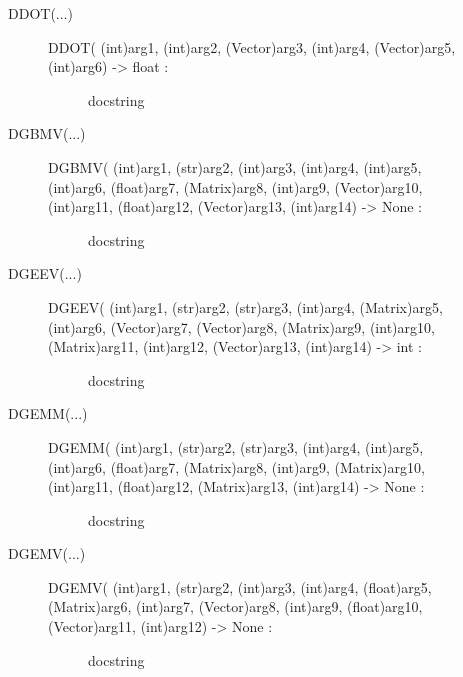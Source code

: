\documentclass[letterpaper,10pt,english]{sphinxmanual}
\begin{document}
\begin{description}
\begin{description}
\begin{description}
\end{description}

\item[{DDOT(...)}] \leavevmode\begin{description}
\item[{DDOT( (int)arg1, (int)arg2, (Vector)arg3, (int)arg4, (Vector)arg5, (int)arg6) -\textgreater{} float :}] \leavevmode
docstring

\end{description}

\item[{DGBMV(...)}] \leavevmode\begin{description}
\item[{DGBMV( (int)arg1, (str)arg2, (int)arg3, (int)arg4, (int)arg5, (int)arg6, (float)arg7, (Matrix)arg8, (int)arg9, (Vector)arg10, (int)arg11, (float)arg12, (Vector)arg13, (int)arg14) -\textgreater{} None :}] \leavevmode
docstring

\end{description}

\item[{DGEEV(...)}] \leavevmode\begin{description}
\item[{DGEEV( (int)arg1, (str)arg2, (str)arg3, (int)arg4, (Matrix)arg5, (int)arg6, (Vector)arg7, (Vector)arg8, (Matrix)arg9, (int)arg10, (Matrix)arg11, (int)arg12, (Vector)arg13, (int)arg14) -\textgreater{} int :}] \leavevmode
docstring

\end{description}

\item[{DGEMM(...)}] \leavevmode\begin{description}
\item[{DGEMM( (int)arg1, (str)arg2, (str)arg3, (int)arg4, (int)arg5, (int)arg6, (float)arg7, (Matrix)arg8, (int)arg9, (Matrix)arg10, (int)arg11, (float)arg12, (Matrix)arg13, (int)arg14) -\textgreater{} None :}] \leavevmode
docstring

\end{description}

\item[{DGEMV(...)}] \leavevmode\begin{description}
\item[{DGEMV( (int)arg1, (str)arg2, (int)arg3, (int)arg4, (float)arg5, (Matrix)arg6, (int)arg7, (Vector)arg8, (int)arg9, (float)arg10, (Vector)arg11, (int)arg12) -\textgreater{} None :}] \leavevmode
docstring

\end{description}


\end{description}
\end{description}
\end{document}
